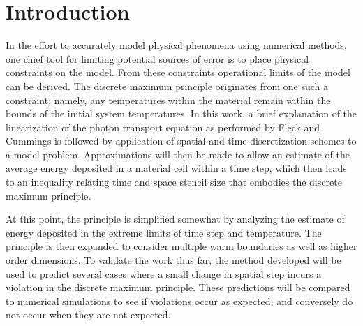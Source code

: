 \section{Introduction}
In the effort to accurately model physical phenomena using numerical methods,
one chief tool for limiting potential sources of error is to place physical
constraints on the model.  From these constraints operational limits of the
model can be derived.  The discrete maximum principle originates from one such
a constraint; namely, any temperatures within the material remain
within the bounds of the initial system temperatures.  In this work, a brief
explanation of the linearization of the
photon transport equation as performed by Fleck and Cummings \cite{FleckCumm}
is followed by application of spatial and time discretization schemes to a
model problem.  Approximations will then be made to allow an estimate of the
average energy deposited in a material cell within a time step, which then
leads to an inequality relating time and space stencil size that embodies the
discrete maximum principle.  

At this point, the principle is simplified somewhat by analyzing the estimate
of energy deposited in the extreme limits of time step and temperature.  The
principle is then expanded to consider multiple warm boundaries as well as
higher order dimensions.  To validate the work thus far, the method developed
will be used to predict several cases where a small change in spatial step
incurs a violation in the discrete maximum principle.  These predictions will
be compared to numerical simulations to see if violations occur as expected,
and conversely do not occur when they are not expected.

